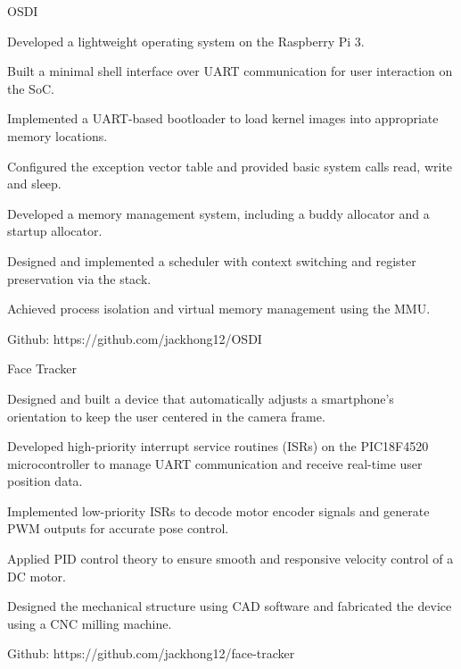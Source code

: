 

\begin{cventries}

  \cventry
    {} %
    {OSDI} %
    {} %
    {} %
    {
      \begin{cvitems} %
        \item {Developed a lightweight operating system on the Raspberry Pi 3.}
        \item {Built a minimal shell interface over UART communication for user interaction on the SoC.}
        \item {Implemented a UART-based bootloader to load kernel images into appropriate memory locations.}
        \item {Configured the exception vector table and provided basic system calls read, write and sleep.}
        \item {Developed a memory management system, including a buddy allocator and a startup allocator.}
        \item {Designed and implemented a scheduler with context switching and register preservation via the stack.}
        \item {Achieved process isolation and virtual memory management using the MMU.}
        \item {Github: https://github.com/jackhong12/OSDI}
      \end{cvitems}
    }

  \cventry
    {} %
    {Face Tracker} %
    {} %
    {} %
    {
      \begin{cvitems} %
        \item {Designed and built a device that automatically adjusts a smartphone's orientation to keep the user centered in the camera frame.}
        \item {Developed high-priority interrupt service routines (ISRs) on the PIC18F4520 microcontroller to manage UART communication and receive real-time user position data.}
        \item {Implemented low-priority ISRs to decode motor encoder signals and generate PWM outputs for accurate pose control.}
        \item {Applied PID control theory to ensure smooth and responsive velocity control of a DC motor.}
        \item {Designed the mechanical structure using CAD software and fabricated the device using a CNC milling machine.}
        \item {Github: https://github.com/jackhong12/face-tracker}
      \end{cvitems}
    }

\end{cventries}
